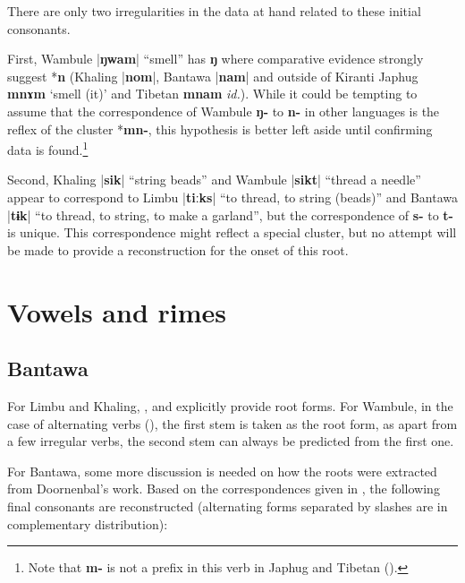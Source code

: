 \documentclass[oldfontcommands,oneside,a4paper,11pt]{article}
\newcommand{\ipa}[1]{\textbf{{\phon\mbox{#1}}}} %
\newcommand{\dhatu}[2]{|\ipa{#1}| ``#2''}
\begin{document}
There are only two irregularities in the data at hand related to these initial consonants.

First, Wambule \dhatu{ŋwam}{smell} has \ipa{ŋ} where comparative evidence strongly suggest *\ipa{n} (Khaling |\ipa{nom}|, Bantawa  |\ipa{nam}| and outside of Kiranti Japhug \ipa{mnɤm} `smell (it)' and Tibetan \ipa{mnam} \textit{id.}). While it could be tempting to assume that the correspondence of Wambule \ipa{ŋ-} to \ipa{n-} in other languages is the reflex of the cluster *\ipa{mn-}, this hypothesis is better left aside until confirming data is found.\footnote{Note that \ipa{m-} is not a prefix in this verb in Japhug and Tibetan (\citealt{hill14derivational, jacques14snom}).}

Second, Khaling \dhatu{sik}{string beads} and Wambule \dhatu{sikt}{thread a needle} appear to correspond to Limbu \dhatu{tiːks}{to thread, to string (beads)}  and Bantawa \dhatu{tɨk}{to thread, to string, to make a garland}, but the correspondence of \ipa{s-} to \ipa{t-} is unique. This correspondence might reflect a special cluster, but no attempt will be made to provide a reconstruction for the onset of this root.

\section{Vowels and rimes} \label{sec:rhymes}

\subsection{Bantawa} \label{sec:bantawa}
 
 For Limbu and Khaling, \citet{michailovsky02dico}, \citet{jacques12khaling} and \citet{jacques16si} explicitly provide root forms. For Wambule, in the case of alternating verbs (\citealt[255-263]{opgenort04wambule}), the first stem is taken as the root form, as apart from a few irregular verbs, the second stem can always be predicted from the first one.  
 
 For Bantawa, some more discussion is needed on how the roots were extracted from Doornenbal's work. Based on the correspondences given in \citet[129; 132]{doornenbal09}, the following final consonants are reconstructed (alternating forms separated by slashes are in complementary distribution):
\end{document}
